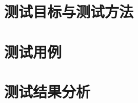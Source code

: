 \section{测试目标与测试方法}\label{sec:test-target}



\section{测试用例}\label{sec:test-case}



\section{测试结果分析}\label{sec:test-result}

